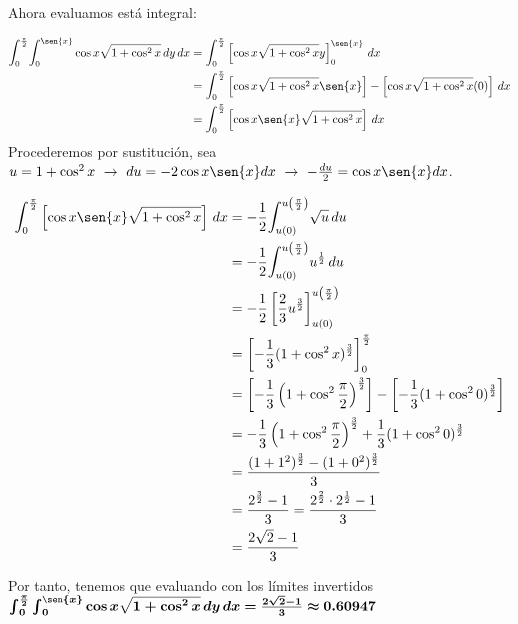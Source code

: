 \documentclass[12pt]{exam}
\begin{document}
\begin{questions}
\begin{enumerate}[a)]
 Ahora evaluamos está integral:
 

\begin{align*}
  \mathlarger{\int}_0^{\frac{\pi}{2}}  \mathlarger{\int}_{0}^{\sen{x}} \cos{x}\sqrt{1+\cos^2{x}} \,dy\,dx
  &= \mathlarger{\int}_0^{\frac{\pi}{2}}  \left [ \cos{x}\sqrt{1+\cos^2{x}} y\right]_{0}^{\sen{x}} \,dx \\
  &= \mathlarger{\int}_0^{\frac{\pi}{2}}  \left [ \cos{x}\sqrt{1+\cos^2{x}} \sen{x} \right] - \left [ \cos{x}\sqrt{1+\cos^2{x}} (0) \right]  \,dx \\
  &= \mathlarger{\int}_0^{\frac{\pi}{2}}  \left [ \cos{x}\sen{x}\sqrt{1+\cos^2{x}}  \right] \,dx
\end{align*}
Procederemos por sustitución, sea $u = 1+\cos^2{x} ~ \rightarrow  ~ du = -2\cos{x}\sen{x}dx ~ \rightarrow  ~ -\frac{du}{2} = \cos{x}\sen{x}dx$. 

\begin{align*}
  \mathlarger{\int}_0^{\frac{\pi}{2}}  \left [ \cos{x}\sen{x}\sqrt{1+\cos^2{x}}  \right] \,dx
  &=  -\frac{1}{2}\mathlarger{\int}_{u(0)}^{u\left(\frac{\pi}{2}\right)}  \sqrt{u}  \,du \\
  &=  -\frac{1}{2}\mathlarger{\int}_{u(0)}^{u\left(\frac{\pi}{2}\right)}  u^{\frac{1}{2}}  \,du \\
  &=  -\frac{1}{2}\left[ \frac{2}{3}u^{\frac{3}{2}}  \right]_{u(0)}^{u\left(\frac{\pi}{2}\right)} \\
  &= \left[ -\frac{1}{3}( 1+\cos^2{x})^{\frac{3}{2}}  \right]_{0}^{\frac{\pi}{2}} \\
  &= \left[ -\frac{1}{3}\left( 1+\cos^2{\frac{\pi}{2}}\right)^{\frac{3}{2}}  \right] - \left[ -\frac{1}{3}( 1+\cos^2{0})^{\frac{3}{2}}  \right] \\
  &=  -\frac{1}{3}  \left( 1+\cos^2{\frac{\pi}{2}}\right)^{\frac{3}{2}}   + \frac{1}{3}( 1+\cos^2{0})^{\frac{3}{2}}   \\
  &= \frac{(1+1^2)^{\frac{3}{2}}  - (1+0^2)^{\frac{3}{2}} }{3} \\
  &= \frac{2^{\frac{3}{2}}  - 1 }{3} = \frac{2^{\frac{2}{2}} \cdot 2^{\frac{1}{2}} - 1 }{3} \\
  &= \frac{2 \sqrt{2} - 1 }{3}
\end{align*}
     \end{enumerate}

     Por tanto, tenemos que evaluando con los límites invertidos $\boldsymbol{ \int_0^{\frac{\pi}{2}}\int_{0}^{\sen{x}} \cos{x}\sqrt{1+\cos^2{x}} \,dy\,dx = \frac{2 \sqrt{2} - 1 }{3} \approx 0.60947} $
     

\end{questions}
\end{document}
